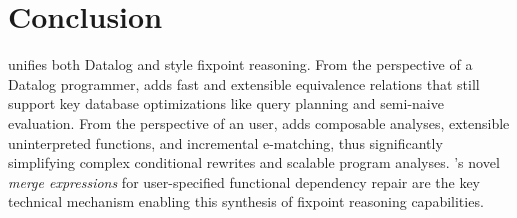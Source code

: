 \section{Conclusion}

\egglog unifies both Datalog and \eqsat
  style fixpoint reasoning.
From the perspective of a Datalog programmer,
  \egglog adds fast and extensible equivalence relations
  that still support key database optimizations
  like query planning and semi-naive evaluation.
From the perspective of an \eqsat user,
  \egglog adds composable analyses,
  extensible uninterpreted functions, and
  incremental e-matching,
  thus significantly simplifying
  complex conditional rewrites and
  scalable program analyses.
\egglog's novel \textit{merge expressions}
  for user-specified functional dependency repair
  are the key technical mechanism enabling this
  synthesis of fixpoint reasoning capabilities.

